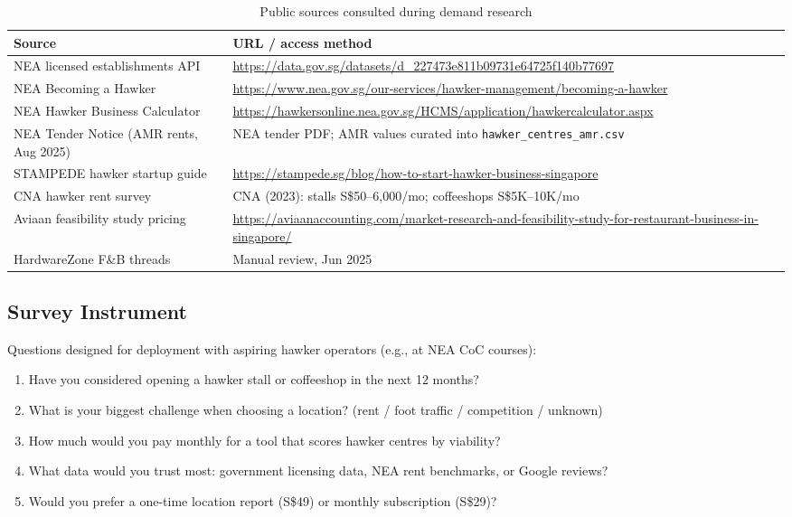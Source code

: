 \documentclass[11pt,a4paper]{article}
\begin{document}
\begin{table}[H]
\centering
\caption{Public sources consulted during demand research}
\label{tab:sources}
\small
\begin{tabular}{@{}ll@{}}
\toprule
\textbf{Source} & \textbf{URL / access method} \\
\midrule
NEA licensed establishments API & \url{https://data.gov.sg/datasets/d_227473e811b09731e64725f140b77697} \\
NEA Becoming a Hawker & \url{https://www.nea.gov.sg/our-services/hawker-management/becoming-a-hawker} \\
NEA Hawker Business Calculator & \url{https://hawkersonline.nea.gov.sg/HCMS/application/hawkercalculator.aspx} \\
NEA Tender Notice (AMR rents, Aug 2025) & NEA tender PDF; AMR values curated into \texttt{hawker\_centres\_amr.csv} \\
STAMPEDE hawker startup guide & \url{https://stampede.sg/blog/how-to-start-hawker-business-singapore} \\
CNA hawker rent survey & CNA (2023): stalls S\$50--6,000/mo; coffeeshops S\$5K--10K/mo \\
Aviaan feasibility study pricing & \url{https://aviaanaccounting.com/market-research-and-feasibility-study-for-restaurant-business-in-singapore/} \\
HardwareZone F\&B threads & Manual review, Jun 2025 \\
\bottomrule
\end{tabular}
\end{table}

\subsection{Survey Instrument}

Questions designed for deployment with aspiring hawker operators (e.g., at NEA CoC courses):
\begin{enumerate}
  \item Have you considered opening a hawker stall or coffeeshop in the next 12 months?
  \item What is your biggest challenge when choosing a location? (rent / foot traffic / competition / unknown)
  \item How much would you pay monthly for a tool that scores hawker centres by viability?
  \item What data would you trust most: government licensing data, NEA rent benchmarks, or Google reviews?
  \item Would you prefer a one-time location report (S\$49) or monthly subscription (S\$29)?
\end{enumerate}
\end{document}
